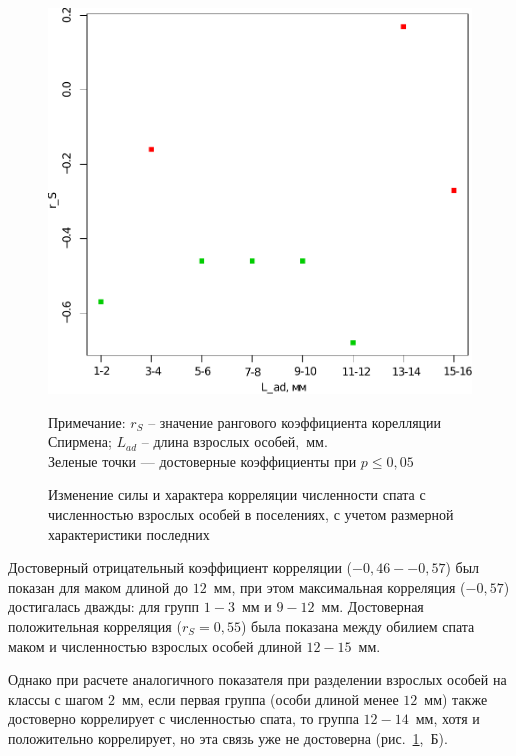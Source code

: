 \begin{figure}[p]
\begin{minipage}[b]{.46\linewidth}
	\begin{center}
		\includegraphics[width=\textwidth]{../White_Sea/spat/spearman_spat_2mm_1.pdf}
	\end{center}
	\end{minipage}
	\caption{Изменение силы и характера корреляции численности спата с численностью взрослых особей в поселениях, с учетом размерной характеристики последних}
	\label{ris:spearman_size}
	
	\footnotesize{Примечание: $r_S$ – значение рангового коэффициента корелляции Спирмена;
 $L_{ad}$ – длина взрослых особей,~мм. \\
Зеленые точки --- достоверные коэффициенты при $p \le 0,05$}
	\end{figure}
Достоверный отрицательный коэффициент корреляции ($-0,46 - -0,57$) был показан для маком длиной до $12$~мм, при этом максимальная корреляция ($-0,57$) достигалась дважды: для групп $1-3$~мм и $9-12$~мм. 
Достоверная положительная корреляция ($r_S=0,55$) была показана между обилием спата маком и численностью взрослых особей длиной $12-15$~мм.

Однако при расчете аналогичного показателя при разделении взрослых особей на классы с шагом $2$~мм, если первая группа (особи длиной менее $12$~мм) также достоверно коррелирует с численностью спата, то группа $12-14$~мм, хотя и положительно коррелирует, но эта связь уже не достоверна (рис.~\ref{ris:spearman_size},~Б).

